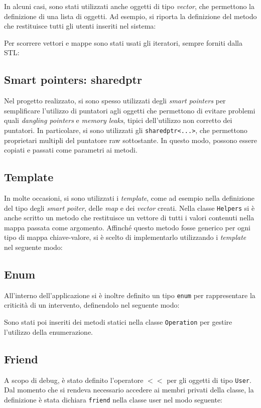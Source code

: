 In alcuni casi, sono stati utilizzati anche oggetti di tipo \textit{vector}, che permettono la definizione di una lista di oggetti. Ad esempio, si riporta la definizione del metodo che restituisce tutti gli utenti inseriti nel sistema:


Per scorrere vettori e mappe sono stati usati gli iteratori, sempre forniti dalla STL:


\subsection{Smart pointers: shared\textunderscore ptr} 
Nel progetto realizzato, si sono spesso utilizzati degli \textit{smart pointers} per semplificare l'utilizzo di puntatori agli oggetti che permettono di evitare problemi quali \textit{dangling pointers} e \textit{memory leaks}, tipici dell'utilizzo non corretto dei puntatori. In particolare, si sono utilizzati gli \texttt{shared\textunderscore ptr<...>}, che permettono proprietari multipli del puntatore raw sottostante. In questo modo, possono essere copiati e passati come parametri ai metodi.


\subsection{Template}
In molte occasioni, si sono utilizzati i \textit{template}, come ad esempio nella definizione del tipo degli \textit{smart poiter}, delle \textit{map} e dei \textit{vector} creati. Nella classe \texttt{Helpers} si è anche scritto un metodo che restituisce un vettore di tutti i valori contenuti nella mappa passata come argomento. Affinché questo metodo fosse generico per ogni tipo di mappa chiave-valore, si è scelto di implementarlo utilizzando i \textit{template} nel seguente modo:


\subsection{Enum}
All'interno dell'applicazione si è inoltre definito un tipo \texttt{enum} per rappresentare la criticità di un intervento, definendolo nel seguente modo:

Sono stati poi inseriti dei metodi statici nella classe \texttt{Operation} per gestire l'utilizzo della enumerazione.

\subsection{Friend}
A scopo di debug, è stato definito l'operatore $<<$ per gli oggetti di tipo \texttt{User}. Dal momento che si rendeva necessario accedere ai membri privati della classe, la definizione è stata dichiara \texttt{friend} nella classe user nel modo seguente:

